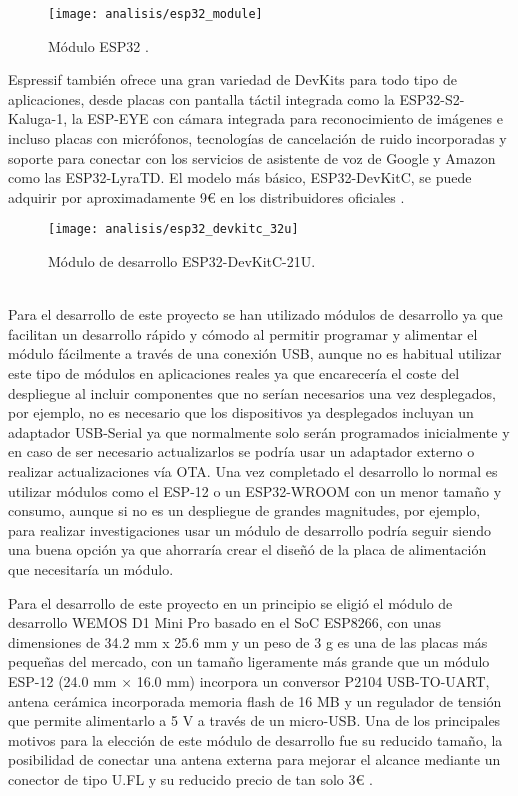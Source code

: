 \documentclass[../proyecto.tex]{subfiles}
\begin{document}
\begin{figure}[H]
\centering
\texttt{[image: analisis/esp32\_module]}
\caption{Módulo ESP32  \cite{esp32_module}.}
\label{fig:esp32_module}
\end{figure}

Espressif también ofrece una gran variedad de DevKits para todo tipo de aplicaciones, desde placas con pantalla táctil integrada como la ESP32-S2-Kaluga-1, la ESP-EYE con cámara integrada para reconocimiento de imágenes e incluso placas con micrófonos, tecnologías de cancelación de ruido incorporadas y soporte para conectar con los servicios de asistente de voz de Google y Amazon como las ESP32-LyraTD. El modelo más básico, ESP32-DevKitC, se puede adquirir por aproximadamente 9€ en los distribuidores oficiales \cite{espressif_provider_digikey} \cite{espressif_provider_mouser}.\\

\begin{figure}[H]
\centering
\texttt{[image: analisis/esp32\_devkitc\_32u]}
\caption{Módulo de desarrollo ESP32-DevKitC-21U.}
\label{fig:esp32_devkitc_32u}
\end{figure}

\\

Para el desarrollo de este proyecto se han utilizado módulos de desarrollo ya que facilitan un desarrollo rápido y cómodo al permitir programar y alimentar el módulo fácilmente a través de una conexión USB, aunque no es habitual utilizar este tipo de módulos en aplicaciones reales ya que encarecería el coste del despliegue al incluir componentes que no serían necesarios una vez desplegados, por ejemplo, no es necesario que los dispositivos ya desplegados incluyan un adaptador USB-Serial ya que normalmente solo serán programados inicialmente y en caso de ser necesario actualizarlos se podría usar un adaptador externo o realizar actualizaciones vía OTA. Una vez completado el desarrollo lo normal es utilizar módulos como el ESP-12 o un ESP32-WROOM con un menor tamaño y consumo, aunque si no es un despliegue de grandes magnitudes, por ejemplo, para realizar investigaciones usar un módulo de desarrollo podría seguir siendo una buena opción ya que ahorraría crear el diseñó de la placa de alimentación que necesitaría un módulo.

Para el desarrollo de este proyecto en un principio se eligió el módulo de desarrollo WEMOS D1 Mini Pro basado en el SoC ESP8266, con unas dimensiones de 34.2 mm x 25.6 mm y un peso de 3 g es una de las placas más pequeñas del mercado, con un tamaño ligeramente más grande que un módulo ESP-12 (24.0 mm × 16.0 mm) incorpora un conversor P2104 USB-TO-UART, antena cerámica incorporada memoria flash de 16 MB y un regulador de tensión que permite alimentarlo a 5 V a través de un micro-USB. Una de los principales motivos para la elección de este módulo de desarrollo fue su reducido tamaño, la posibilidad de conectar una antena externa para mejorar el alcance mediante un conector de tipo U.FL y su reducido precio de tan solo 3€ \cite{lolin_official_store}. \\
\end{document}
